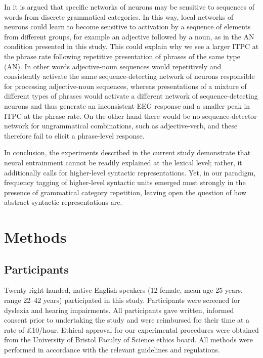 \documentclass[11pt,a4wide]{article}
\newcommand{\citet}[1]{\cite{#1}}
\begin{document}
In \citet{PulvermullerEtAl2002} it is argued that specific networks of
neurons may be sensitive to sequences of words from discrete
grammatical categories. In this way, local networks of neurons could
learn to become sensitive to activation by a sequence of elements from
different groups, for example an adjective followed by a noun, as in
the AN condition presented in this study. This could explain why we
see a larger ITPC at the phrase rate following repetitive presentation
of phrases of the same type (AN). In other words adjective-noun
sequences would repetitively and consistently activate the same
sequence-detecting network of neurons responsible for processing
adjective-noun sequences, whereas presentations of a mixture of
different types of phrases would activate a different network of
sequence-detecting neurons and thus generate an inconsistent EEG
response and a smaller peak in ITPC at the phrase rate. On the other
hand there would be no sequence-detector network for ungrammatical
combinations, such as adjective-verb, and these therefore fail to
elicit a phrase-level response.

In conclusion, the experiments described in the current study
demonstrate that neural entrainment cannot be readily explained at the
lexical level; rather, it additionally calls for higher-level
syntactic representations. Yet, in our paradigm, frequency tagging of
higher-level syntactic units emerged most strongly in the presence of
grammatical category repetition, leaving open the question of how
abstract syntactic representations are.

\section*{Methods}
\subsection*{Participants}

Twenty right-handed, native English speakers (12 female, mean age 25
years, range 22--42 years) participated in this study. Participants
were screened for dyslexia and hearing impairments. All participants
gave written, informed consent prior to undertaking the study and were
reimbursed for their time at a rate of £10/hour. Ethical approval for
our experimental procedures were obtained from the University of
Bristol Faculty of Science ethics board. All methods were performed in
accordance with the relevant guidelines and regulations.
\end{document}
